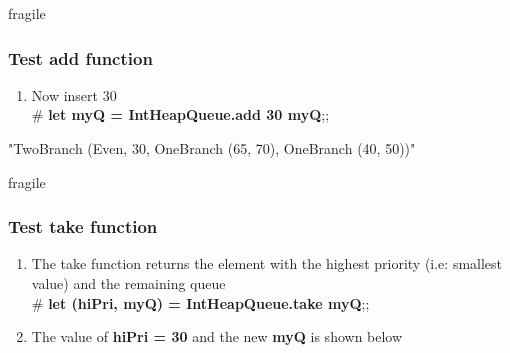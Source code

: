\documentclass{beamer}
\begin{document}
\begin{frame}{fragile}
\frametitle{Test add function}

\begin{example}
\begin{enumerate}
\item Now insert 30\\
 \# {\bf let myQ = IntHeapQueue.add 30 myQ};;
\end{enumerate}
\end{example}

\begin{center}
\end{center}
"TwoBranch (Even, 30, OneBranch (65, 70), OneBranch (40, 50))"
\end{frame}






\begin{frame}{fragile}
\frametitle{Test take function}

\begin{example}
\begin{enumerate}
\item The take function returns the element with the highest priority (i.e: smallest value) and the remaining queue\\
 \# {\bf let (hiPri, myQ) = IntHeapQueue.take myQ};;
\item The value of {\bf hiPri = 30} and the new {\bf myQ} is shown below
\end{enumerate}
\end{example}

\begin{center}
\end{center}

\end{frame}
\end{document}

